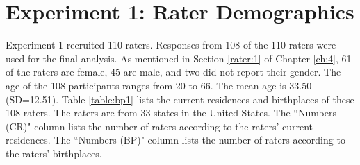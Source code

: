 \section{Experiment 1: Rater Demographics}

Experiment 1 recruited 110 raters. Responses from 108 of the 110 raters were used for the final analysis. As mentioned in Section \ref{rater:1} of Chapter \ref{ch:4}, 61 of the raters are female, 45 are male, and two did not report their gender. The age of the 108 participants ranges from 20 to 66. The mean age is 33.50 (SD=12.51). Table \ref{table:bp1} lists the current residences and birthplaces of these 108 raters. The raters are from 33 states in the United States. The ``Numbers (CR)" column lists the number of raters according to the raters' current residences. The ``Numbers (BP)" column lists the number of raters according to the raters' birthplaces.
 \figSpace
